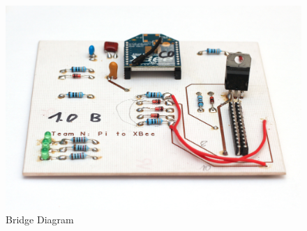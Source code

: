 \begin{figure}[H]
\begin{center}
\includegraphics[width=12cm]{images/photos/edited/master2}
\end{center}
\caption{Bridge Diagram}
\label{fig:Bridge Diagram}
\end{figure}
